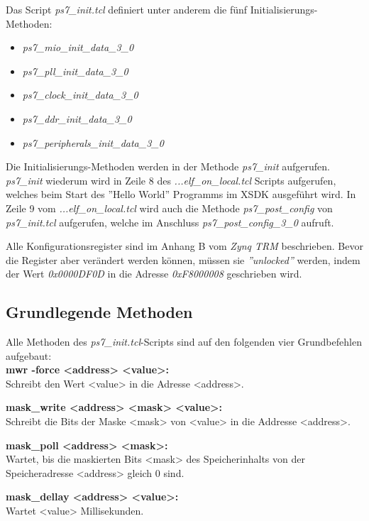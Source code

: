 Das Script \textit{ps7\_init.tcl} definiert unter anderem die fünf Initialisierungs-Methoden:
\begin{itemize}
\item \textit{ps7\_mio\_init\_data\_3\_0}
\item \textit{ps7\_pll\_init\_data\_3\_0}
\item \textit{ps7\_clock\_init\_data\_3\_0} 
\item \textit{ps7\_ddr\_init\_data\_3\_0}
\item \textit{ps7\_peripherals\_init\_data\_3\_0}
\end{itemize}
Die Initialisierungs-Methoden werden in der Methode \textit{ps7\_init} aufgerufen.
\textit{ps7\_init} wiederum wird in Zeile 8 des \textit{...elf\_on\_local.tcl} Scripts aufgerufen, welches beim Start des ''Hello World'' Programms im XSDK ausgeführt wird.
In Zeile 9 vom \textit{...elf\_on\_local.tcl} wird auch die Methode \textit{ps7\_post\_config} von \textit{ps7\_init.tcl} aufgerufen, welche im Anschluss \textit{ps7\_post\_config\_3\_0} aufruft.

Alle Konfigurationsregister sind im Anhang B vom \textit{Zynq TRM}\cite{bib:ZynqTechnicalReferenceManual} beschrieben.
Bevor die Register aber verändert werden können, müssen sie \textit{''unlocked''} werden, indem der Wert \textit{0x0000DF0D} in die Adresse \textit{0xF8000008} geschrieben wird.


\subsection{Grundlegende Methoden}
Alle Methoden des \textit{ps7\_init.tcl}-Scripts sind auf den folgenden vier Grundbefehlen aufgebaut:\\
\textbf{mwr -force <address> <value>: }\\
Schreibt den Wert <value> in die Adresse <address>.

\textbf{mask\_write <address> <mask> <value>: }\\
Schreibt die Bits der Maske <mask> von <value> in die Addresse <address>.

\textbf{mask\_poll <address> <mask>:  }\\
Wartet, bis die maskierten Bits <mask> des Speicherinhalts von der Speicheradresse <address> gleich 0 sind.

\textbf{mask\_dellay <address> <value>:}\\
Wartet <value> Millisekunden.

